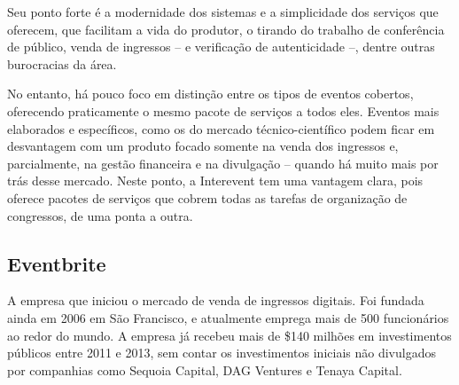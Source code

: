\documentclass[12pt,a4paper,twoside,hyphens,english,brazil]{abntex2}
\begin{document}
Seu ponto forte é a modernidade dos sistemas e a simplicidade dos serviços que oferecem, que facilitam a vida do produtor, o tirando do trabalho de conferência de público, venda de ingressos -- e verificação de autenticidade --, dentre outras burocracias da área.

No entanto, há pouco foco em distinção entre os tipos de eventos cobertos, oferecendo praticamente o mesmo pacote de serviços a todos eles. Eventos mais elaborados e específicos, como os do mercado técnico-científico podem ficar em desvantagem com um produto focado somente na venda dos ingressos e, parcialmente, na gestão financeira e na divulgação -- quando há muito mais por trás desse mercado. Neste ponto, a Interevent tem uma vantagem clara, pois oferece pacotes de serviços que cobrem todas as tarefas de organização de congressos, de uma ponta a outra.

\subsection{Eventbrite}
A empresa que iniciou o mercado de venda de ingressos digitais. Foi fundada ainda em 2006 em São Francisco, e atualmente emprega mais de 500 funcionários ao redor do mundo. A empresa já recebeu mais de \$140 milhões em investimentos públicos entre 2011 e 2013, sem contar os investimentos iniciais não divulgados por companhias como Sequoia Capital, DAG Ventures e Tenaya Capital. \cite{eventbrite-wiki}
\end{document}
